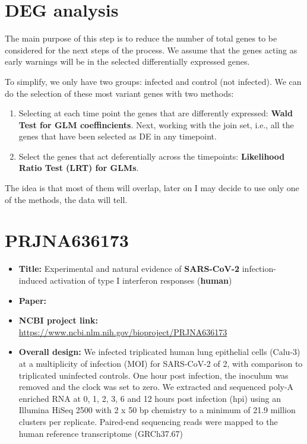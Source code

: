 \documentclass[
]{book}
\begin{document}
\hypertarget{deg-analysis}{%
\chapter{DEG analysis}\label{deg-analysis}}

The main purpose of this step is to reduce the number of total genes to be considered for the next steps of the process. We assume that the genes acting as early warnings will be in the selected differentially expressed genes.

To simplify, we only have two groups: infected and control (not infected). We can do the selection of these most variant genes with two methods:

\begin{enumerate}
\def\labelenumi{\arabic{enumi})}
\item
  Selecting at each time point the genes that are differently expressed: \textbf{Wald Test for GLM coeffincients}. Next, working with the join set, i.e., all the genes that have been selected as DE in any timepoint.
\item
  Select the genes that act deferentially across the timepoints: \textbf{Likelihood Ratio Test (LRT) for GLMs}.
\end{enumerate}

The idea is that most of them will overlap, later on I may decide to use only one of the methods, the data will tell.

\hypertarget{PRJNA636173}{%
\chapter{PRJNA636173}\label{PRJNA636173}}

\begin{itemize}
\item
  \textbf{Title:} Experimental and natural evidence of \textbf{SARS-CoV-2} infection-induced activation of type I interferon responses (\textbf{human})
\item
  \textbf{Paper:} \citep{Banerjee2021}
\item
  \textbf{NCBI project link:} \url{https://www.ncbi.nlm.nih.gov/bioproject/PRJNA636173}
\item
  \textbf{Overall design:} We infected triplicated human lung epithelial cells (Calu-3) at a multiplicity of infection (MOI) for SARS-CoV-2 of 2, with comparison to triplicated uninfected controls. One hour post infection, the inoculum was removed and the clock was set to zero. We extracted and sequenced poly-A enriched RNA at 0, 1, 2, 3, 6 and 12 hours post infection (hpi) using an Illumina HiSeq 2500 with 2 x 50 bp chemistry to a minimum of 21.9 million clusters per replicate. Paired-end sequencing reads were mapped to the human reference transcriptome (GRCh37.67)
\end{itemize}
\end{document}
